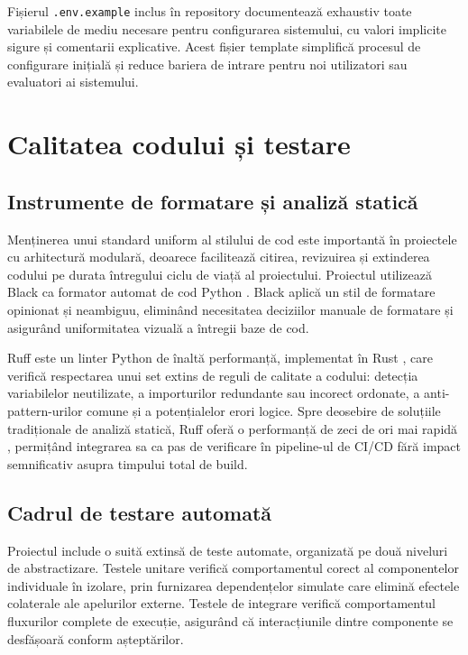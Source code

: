 \documentclass[12pt, a4paper, oneside, romanian]{teza-upb}
\begin{document}
Fișierul \texttt{.env.example} inclus în repository documentează exhaustiv toate variabilele de mediu necesare pentru configurarea sistemului, cu valori implicite sigure și comentarii explicative. Acest fișier template simplifică procesul de configurare inițială și reduce bariera de intrare pentru noi utilizatori sau evaluatori ai sistemului.

\section{Calitatea codului și testare}

\subsection{Instrumente de formatare și analiză statică}

Menținerea unui standard uniform al stilului de cod este importantă în proiectele cu arhitectură modulară, deoarece facilitează citirea, revizuirea și extinderea codului pe durata întregului ciclu de viață al proiectului. Proiectul utilizează Black ca formator automat de cod Python \cite{black_doc}. Black aplică un stil de formatare opinionat și neambiguu, eliminând necesitatea deciziilor manuale de formatare și asigurând uniformitatea vizuală a întregii baze de cod.

Ruff este un linter Python de înaltă performanță, implementat în Rust \cite{ruff_doc}, care verifică respectarea unui set extins de reguli de calitate a codului: detecția variabilelor neutilizate, a importurilor redundante sau incorect ordonate, a anti-pattern-urilor comune și a potențialelor erori logice. Spre deosebire de soluțiile tradiționale de analiză statică, Ruff oferă o performanță de zeci de ori mai rapidă \cite{ruff_doc}, permițând integrarea sa ca pas de verificare în pipeline-ul de CI/CD fără impact semnificativ asupra timpului total de build.

\subsection{Cadrul de testare automată}

Proiectul include o suită extinsă de teste automate, organizată pe două niveluri de abstractizare. Testele unitare verifică comportamentul corect al componentelor individuale în izolare, prin furnizarea dependențelor simulate care elimină efectele colaterale ale apelurilor externe. Testele de integrare verifică comportamentul fluxurilor complete de execuție, asigurând că interacțiunile dintre componente se desfășoară conform așteptărilor.
\end{document}
